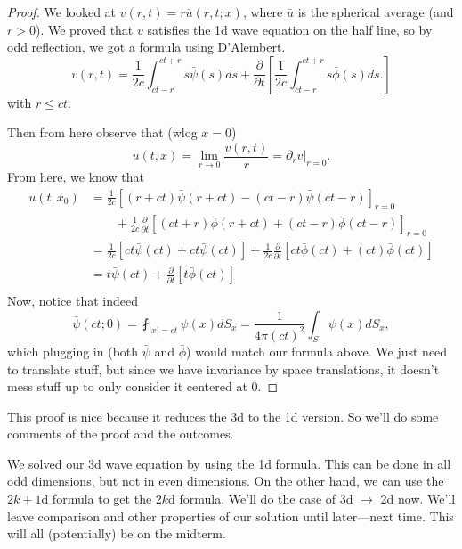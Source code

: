 \begin{proof}
	We looked at \( v(r, t) = r \bar u(r, t ; x) \), where \( \bar u \) is the spherical average (and \( r > 0 \)). We proved that \( v \) satisfies the 1d wave equation on the half line, so by odd reflection, we got a formula using D'Alembert.
	\[ v(r, t) = \frac{1}{2c} \int_{ct - r}^{ct + r} s \bar \psi(s) ds + \frac{\partial}{\partial t} \left[ \frac{1}{2 c} \int_{ct - r}^{ct + r} s \bar \phi(s) ds. \right] \]
		with \( r \le ct \).

		Then from here observe that (wlog \( x = 0 \))
		\[ u(t , x) = \lim_{r \to 0} \frac{v(r, t)}{r} = \left. \partial_{r} v \right|_{r = 0}.\]
			From here, we know that
	\begin{align*}
		u(t, x_{0}) &= \frac{1}{2 c} \left[ (r + ct) \bar \psi(r + ct) - (ct - r) \bar \psi(ct - r) \right]_{r = 0} \\ 
							 &\qquad+ \frac{1}{2c} \frac{\partial}{\partial t} \left[ (ct+r) \bar \phi(r + ct) + (ct - r) \bar \phi(ct -r) \right]_{r = 0}  \\
							 &= \frac{1}{2 c} \left[ ct \bar \psi(ct) +ct \bar \psi(ct) \right] + \frac{1}{2c} \frac{\partial}{\partial t} \left[ ct \bar \phi(ct) + (ct) \bar \phi(ct) \right]  \\
							 &= t \bar \psi(ct) + \frac{\partial}{\partial t} \left[ t \bar \phi(ct) \right]  \\
	\end{align*}
	Now, notice that indeed
	\[ \bar \psi(ct ; 0) = \fint_{|x| = ct} \psi(x) dS_{x} = \frac{1}{4 \pi \left( ct \right)^{2}} \int_{S} \psi(x) dS_{x}, \]
	which plugging in (both \( \bar \psi \) and \( \bar \phi \)) would match our formula above. We just need to translate stuff, but since we have invariance by space translations, it doesn't mess stuff up to only consider it centered at \( 0 \).
\end{proof}
This proof is nice because it reduces the 3d to the 1d version. So we'll do some comments of the proof and the outcomes.
\begin{remark}
	We solved our 3d wave equation by using the 1d formula. This can be done in all odd dimensions, but not in even dimensions. On the other hand, we can use the \( 2k+1 \)d formula to get the \( 2k \)d formula. We'll do the case of 3d \( \to \) 2d  now. We'll leave comparison and other properties of our solution until later---next time. This will all (potentially) be on the midterm.
\end{remark}

